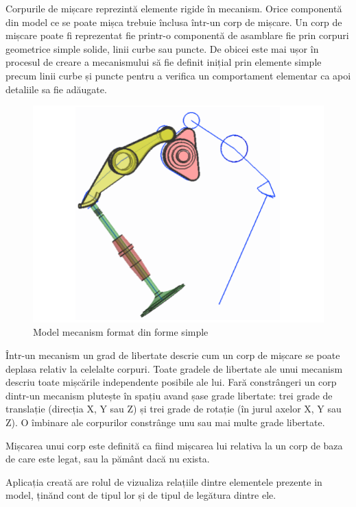 
Corpurile de mișcare reprezintă elemente rigide în mecanism. Orice componentă din model ce se poate mișca trebuie 
înclusa într-un corp de mișcare. Un corp de mișcare poate fi reprezentat fie printr-o componentă de asamblare fie 
prin corpuri geometrice simple solide, linii curbe sau puncte. De obicei este mai ușor în procesul de creare a mecanismului să 
fie definit inițial prin elemente simple precum linii curbe și puncte pentru a verifica un comportament elementar 
ca apoi detaliile sa fie adăugate.\newline

\begin{figure}[H]
    \begin{center}
        \includegraphics[scale=0.7]{imagini/simcenter/body.png}
        \caption{Model mecanism format din forme simple\protect\footnotemark}
        \label{fig:mecanims_curbe}
    \end{center}    
\end{figure}


Într-un mecanism un grad de libertate descrie cum un corp de mișcare se poate deplasa relativ la celelalte corpuri. 
Toate gradele de libertate ale unui mecanism descriu toate mișcările independente posibile ale lui. Fară constrângeri 
un corp dintr-un mecanism plutește în spațiu avand șase grade libertate: trei grade de translație (direcția X, Y sau Z) 
și trei grade de rotație (în jurul axelor X, Y sau Z). O îmbinare ale corpurilor constrânge unu sau mai multe grade libertate. \cite{cae2}\newline

Mișcarea unui corp este definită ca fiind mișcarea lui relativa la un corp de baza de care este legat, sau la pământ dacă nu exista.\newline

Aplicația creată are rolul de vizualiza relațiile dintre elementele prezente in model, ținănd cont de tipul lor și de tipul de legătura dintre ele.

